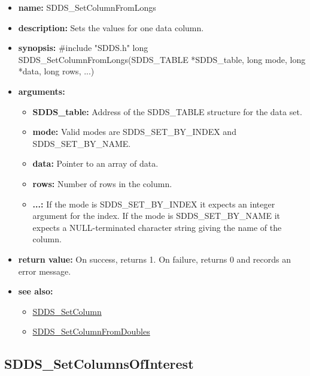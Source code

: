 \documentclass[11pt]{article}
\newcommand{\progref}[1]{\hyperref{SDDS_#1}{{\tt SDDS\_#1} (}{)}{SDDS_#1}}
\begin{document}
\begin{itemize}
\item {\bf name:}\newline
SDDS\_SetColumnFromLongs
\item {\bf description:}\newline
Sets the values for one data column.
\item {\bf synopsis:} \#include "SDDS.h"\newline
long SDDS\_SetColumnFromLongs(SDDS\_TABLE *SDDS\_table, long mode, long *data, long rows, ...)
\item {\bf arguments:}
\begin{itemize}
\item {\bf SDDS\_table:} Address of the SDDS\_TABLE structure for the data set.
\item {\bf mode:} Valid modes are SDDS\_SET\_BY\_INDEX and SDDS\_SET\_BY\_NAME.
\item {\bf data:} Pointer to an array of data.
\item {\bf rows:} Number of rows in the column.
\item {\bf ...:} If the mode is SDDS\_SET\_BY\_INDEX it expects an integer argument for the index. If the mode is SDDS\_SET\_BY\_NAME it expects a NULL-terminated character string giving the name of the column.
\end{itemize}
\item {\bf return value:}\newline
On success, returns 1. On failure, returns 0 and records an error message.
\item {\bf see also:}
\begin{itemize}
\item \progref{SetColumn}
\item \progref{SetColumnFromDoubles}
\end{itemize}
\end{itemize}

\subsection{SDDS\_SetColumnsOfInterest}
\label{SDDS_SetColumnsOfInterest}
\end{document}
